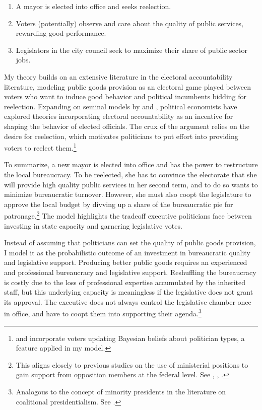 \documentclass[12pt,]{book}
\providecommand{\tightlist}{%
  \setlength{\itemsep}{0pt}\setlength{\parskip}{0pt}}
\let\rmarkdownfootnote\footnote%
\def\footnote{\protect\rmarkdownfootnote}
\begin{document}
\begin{enumerate}
\def\labelenumi{\arabic{enumi}.}
\tightlist
\item
  A mayor is elected into office and seeks reelection.
\item
  Voters (potentially) observe and care about the quality of public services, rewarding good performance.
\item
  Legislators in the city council seek to maximize their share of public sector jobs.
\end{enumerate}

My theory builds on an extensive literature in the electoral accountability literature, modeling public goods provision as an electoral game played between voters who want to induce good behavior and political incumbents bidding for reelection. Expanding on seminal models by \citet{barro_control_1973} and \citet{ferejohn_incumbent_1986}, political economists have explored theories incorporating electoral accountability as an incentive for shaping the behavior of elected officials. The crux of the argument relies on the desire for reelection, which motivates politicians to put effort into providing voters to reelect them.\footnote{\citet{coate_form_1995} and \citet{besley_principled_2006} incorporate voters updating Bayesian beliefs about politician types, a feature applied in my model.}

To summarize, a new mayor is elected into office and has the power to restructure the local bureaucracy. To be reelected, she has to convince the electorate that she will provide high quality public services in her second term, and to do so wants to minimize bureaucratic turnover. However, she must also coopt the legislature to approve the local budget by divving up a share of the bureaucratic pie for patronage.\footnote{This aligns closely to previous studies on the use of ministerial positions to gain support from opposition members at the federal level. See \citet{loureiro_politica_1999}, \citet{loureiro_radiografia_2014}, \citet{lopez_cargos_2018}.} The model highlights the tradeoff executive politicians face between investing in state capacity and garnering legislative votes.

Instead of assuming that politicians can set the quality of public goods provision, I model it as the probabilistic outcome of an investment in bureaucratic quality and legislative support. Producing better public goods requires an experienced and professional bureaucracy and legislative support. Reshuffling the bureaucracy is costly due to the loss of professional expertise accumulated by the inherited staff, but this underlying capacity is meaningless if the legislative does not grant its approval. The executive does not always control the legislative chamber once in office, and have to coopt them into supporting their agenda.\footnote{Analogous to the concept of minority presidents in the literature on coalitional presidentialism. See \citet{figueiredo_presidential_2000}.}
\end{document}
